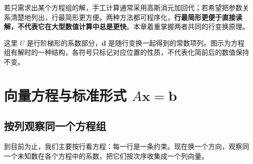 \documentclass[a4paper,12pt,twoside,openany,fontset=none]{ctexbook}
\numberwithin{equation}{chapter}
\begin{document}
若只需求出某个方程组的解，手工计算通常采用高斯消元加回代；若希望把参数关系清楚地列出，行最简形更方便。两种方法都可程序化，\textbf{行最简形更便于直接读解，不代表它在大型数值计算中总是更快}。本章着重掌握两者共同的行变换原理。


这里 $U$ 是行阶梯形的系数部分，$\boldsymbol d$ 是随行变换一起得到的常数项列。图示为方程组有解时的一种结构，各符号只标记对应位置的性质，不代表化简前后的数值保持不变。

\section{向量方程与标准形式 $A\boldsymbol{x}=\boldsymbol{b}$}
\label{sec:two-vector-equation}

\subsection*{按列观察同一个方程组}

到目前为止，我们主要按行看方程：每一行是一条约束。现在换一个方向，观察同一个未知数在各个方程中的系数，把它们按次序收集成一个列向量。
\end{document}
